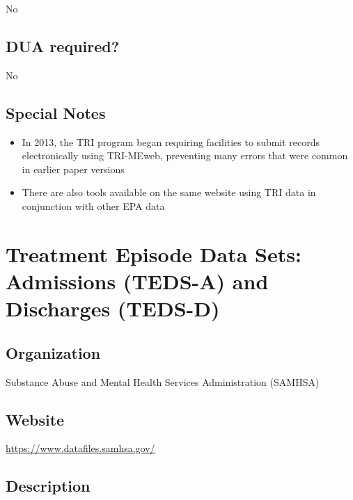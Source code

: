 \documentclass[
]{book}
\providecommand{\tightlist}{%
  \setlength{\itemsep}{0pt}\setlength{\parskip}{0pt}}
\begin{document}
No

\hypertarget{dua-required-88}{%
\section{DUA required?}\label{dua-required-88}}

No

\hypertarget{special-notes-88}{%
\section{Special Notes}\label{special-notes-88}}

\begin{itemize}
\tightlist
\item
  In 2013, the TRI program began requiring facilities to submit records electronically using TRI-MEweb, preventing many errors that were common in earlier paper versions
\item
  There are also tools available on the same website using TRI data in conjunction with other EPA data
\end{itemize}

\mainmatter

\hypertarget{treatment-episode-data-sets-admissions-teds-a-and-discharges-teds-d}{%
\chapter{Treatment Episode Data Sets: Admissions (TEDS-A) and Discharges (TEDS-D)}\label{treatment-episode-data-sets-admissions-teds-a-and-discharges-teds-d}}

\hypertarget{organization-89}{%
\section{Organization}\label{organization-89}}

Substance Abuse and Mental Health Services Administration (SAMHSA)

\hypertarget{website-89}{%
\section{Website}\label{website-89}}

\url{https://www.datafiles.samhsa.gov/}

\hypertarget{description-89}{%
\section{Description}\label{description-89}}
\end{document}
